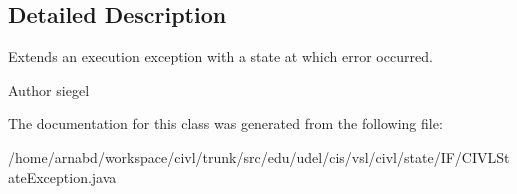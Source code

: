 \subsection{Detailed Description}
Extends an execution exception with a state at which error occurred. 

\begin{DoxyAuthor}{Author}
siegel 
\end{DoxyAuthor}


The documentation for this class was generated from the following file\+:\begin{DoxyCompactItemize}
\item 
/home/arnabd/workspace/civl/trunk/src/edu/udel/cis/vsl/civl/state/\+I\+F/C\+I\+V\+L\+State\+Exception.\+java\end{DoxyCompactItemize}
